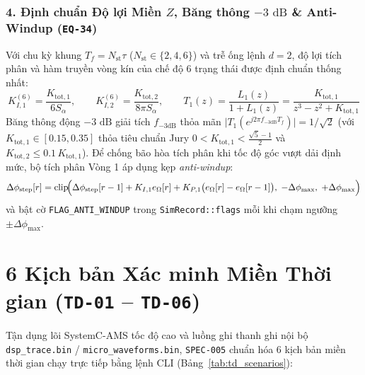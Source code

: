 \documentclass[11pt, a4paper]{article}
\begin{document}
\subsubsection*{4. Định chuẩn Độ lợi Miền $Z$, Băng thông $-3\text{ dB}$ \& Anti-Windup (\texttt{EQ-34})}
Với chu kỳ khung $T_f = N_{\text{st}}\tau$ ($N_{\text{st}} \in \{2, 4, 6\}$) và trễ ống lệnh $d=2$, độ lợi tích phân và hàm truyền vòng kín của chế độ 6 trạng thái được định chuẩn thống nhất:
\begin{equation}
K_{I,1}^{(6)} = \frac{K_{\text{tot},1}}{6 S_\alpha}, \qquad
K_{I,2}^{(6)} = \frac{K_{\text{tot},2}}{8\pi S_\alpha}, \qquad
T_1(z) = \frac{L_1(z)}{1 + L_1(z)} = \frac{K_{\text{tot},1}}{z^3 - z^2 + K_{\text{tot},1}}
\end{equation}
Băng thông động $-3\text{ dB}$ giải tích $f_{-3\text{dB}}$ thỏa mãn $\bigl|T_1(e^{j 2\pi f_{-3\text{dB}} T_f})\bigr| = 1/\sqrt{2}$ (với $K_{\text{tot},1} \in [0.15, 0.35]$ thỏa tiêu chuẩn Jury $0 < K_{\text{tot},1} < \frac{\sqrt{5}-1}{2}$ và $K_{\text{tot},2} \le 0.1\,K_{\text{tot},1}$). Để chống bão hòa tích phân khi tốc độ góc vượt dải định mức, bộ tích phân Vòng 1 áp dụng kẹp \emph{anti-windup}:
\begin{equation}
\Delta\phi_{\text{step}}[r] = \operatorname{clip}\!\Bigl(\Delta\phi_{\text{step}}[r-1] + K_{I,1} e_\Omega[r] + K_{P,1}\bigl(e_\Omega[r] - e_\Omega[r-1]\bigr),\; -\Delta\phi_{\max},\; +\Delta\phi_{\max}\Bigr)
\end{equation}
và bật cờ \texttt{FLAG\_ANTI\_WINDUP} trong \texttt{SimRecord::flags} mỗi khi chạm ngưỡng $\pm\Delta\phi_{\max}$.

\section{6 Kịch bản Xác minh Miền Thời gian (\texttt{TD-01} -- \texttt{TD-06})}

Tận dụng lõi SystemC-AMS tốc độ cao và luồng ghi thanh ghi nội bộ \texttt{dsp\_trace.bin} / \texttt{micro\_waveforms.bin}, \texttt{SPEC-005} chuẩn hóa 6 kịch bản miền thời gian chạy trực tiếp bằng lệnh CLI (Bảng~\ref{tab:td_scenarios}):
\end{document}
